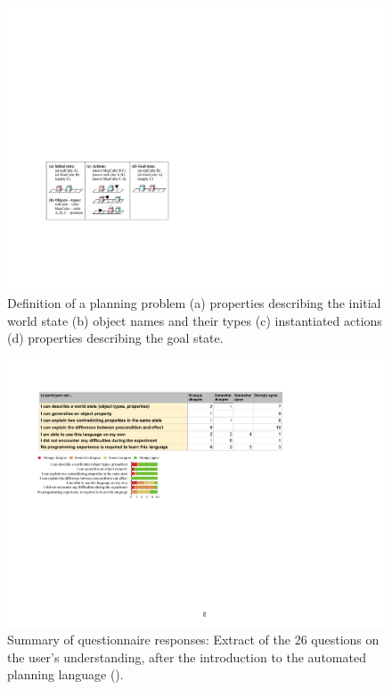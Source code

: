 \begin{figure}[ht]
	\centering
	\includegraphics[width=0.8\linewidth]{figures/planning-permutation}
	\caption{Definition of a planning problem (a) properties describing the initial world state (b) object names and their types (c) instantiated actions (d) properties describing the goal state.}
	\label{fig:planning-permutation}
\end{figure}

\begin{figure}[ht]
	\centering
	\includegraphics[width=0.85\linewidth]{figures/eEvaluation2}
	\caption{Summary of questionnaire responses: Extract of the 26 questions on the user's understanding, after the introduction to the automated planning language ().}
	\label{fig:eEvaluation2}
\end{figure} 

